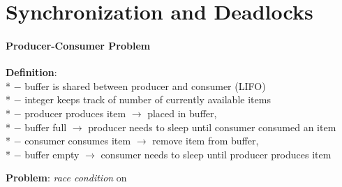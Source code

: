 \section{Synchronization and Deadlocks}

\paragraph{Producer-Consumer Problem}
\begin{items}
  \item \textbf{Definition}: \\*
    $ - $ buffer is shared between producer and consumer (LIFO) \\*
    $ - $  integer keeps track of number of currently available items \\*
    $ - $ producer produces item $ \to $ placed in buffer,  \\*
    $ - $ buffer full $ \to $ producer needs to sleep until consumer consumed an item \\*
    $ - $ consumer consumes item $ \to $ remove item from buffer,  \\*
    $ - $ buffer empty $ \to $ consumer needs to sleep until producer produces item
  \item \textbf{Problem}: \emph{race condition} on 
\end{items}


